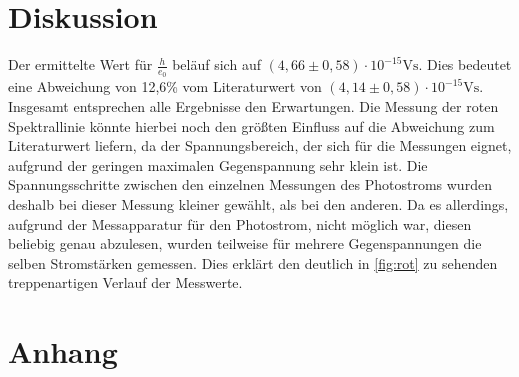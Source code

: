 \section{Diskussion}
\label{sec:Diskussion}

Der ermittelte Wert für $\frac{h}{e_0}$ beläuf sich auf $(4,66 \pm 0,58) \cdot 10^{-15} \si{\volt\second}$. Dies bedeutet eine Abweichung von 12,6\% vom Literaturwert von
$(4,14 \pm 0,58) \cdot 10^{-15} \si{\volt\second}$. 
\newline
Insgesamt entsprechen alle Ergebnisse den Erwartungen. Die Messung der roten Spektrallinie könnte hierbei noch den größten Einfluss auf die Abweichung zum Literaturwert
liefern, da der Spannungsbereich, der sich für die Messungen eignet, aufgrund der geringen maximalen Gegenspannung sehr klein ist. Die Spannungsschritte zwischen den
einzelnen Messungen des Photostroms wurden deshalb bei dieser Messung kleiner gewählt, als bei den anderen. Da es allerdings, aufgrund der Messapparatur für den Photostrom,
nicht möglich war, diesen beliebig genau abzulesen, wurden teilweise für mehrere Gegenspannungen die selben Stromstärken gemessen. Dies erklärt den deutlich
in \autoref{fig:rot} zu sehenden treppenartigen Verlauf der Messwerte.

\section{Anhang}
\label{sec:Anhang}

